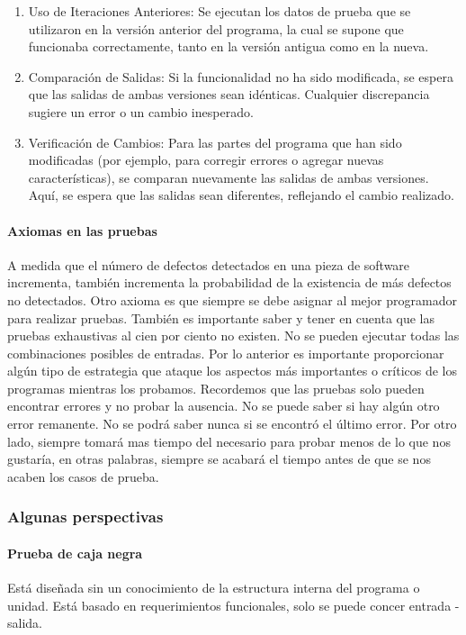 \begin{enumerate}
    \item Uso de Iteraciones Anteriores: Se ejecutan los datos de prueba que se utilizaron en la versión anterior del programa, la cual se supone que funcionaba correctamente, tanto en la versión antigua como en la nueva.
    \item Comparación de Salidas: Si la funcionalidad no ha sido modificada, se espera que las salidas de ambas versiones sean idénticas. Cualquier discrepancia sugiere un error o un cambio inesperado.
    \item Verificación de Cambios: Para las partes del programa que han sido modificadas (por ejemplo, para corregir errores o agregar nuevas características), se comparan nuevamente las salidas de ambas versiones. Aquí, se espera que las salidas sean diferentes, reflejando el cambio realizado.
\end{enumerate}

\paragraph{Axiomas en las pruebas} A medida que el número de defectos detectados en una pieza de software incrementa, también incrementa la probabilidad de la existencia de más defectos no detectados. Otro axioma es que siempre se debe asignar al mejor programador para realizar pruebas. También es importante saber y tener en cuenta que las pruebas exhaustivas al cien por ciento no existen. No se pueden ejecutar todas las combinaciones posibles de entradas. Por lo anterior es importante proporcionar algún tipo de estrategia que ataque los aspectos más importantes o críticos de los programas mientras los probamos. Recordemos que las pruebas solo pueden encontrar errores y no probar la ausencia. No se puede saber si hay algún otro error remanente. No se podrá saber nunca si se encontró el último error. Por otro lado, siempre tomará mas tiempo del necesario para probar menos de lo que nos gustaría, en otras palabras, siempre se acabará el tiempo antes de que se nos acaben los casos de prueba. 

\subsubsection{Algunas perspectivas} 

\paragraph{Prueba de caja negra} Está diseñada sin un conocimiento de la estructura interna del programa o unidad. Está basado en requerimientos funcionales, solo se puede concer entrada - salida. 

